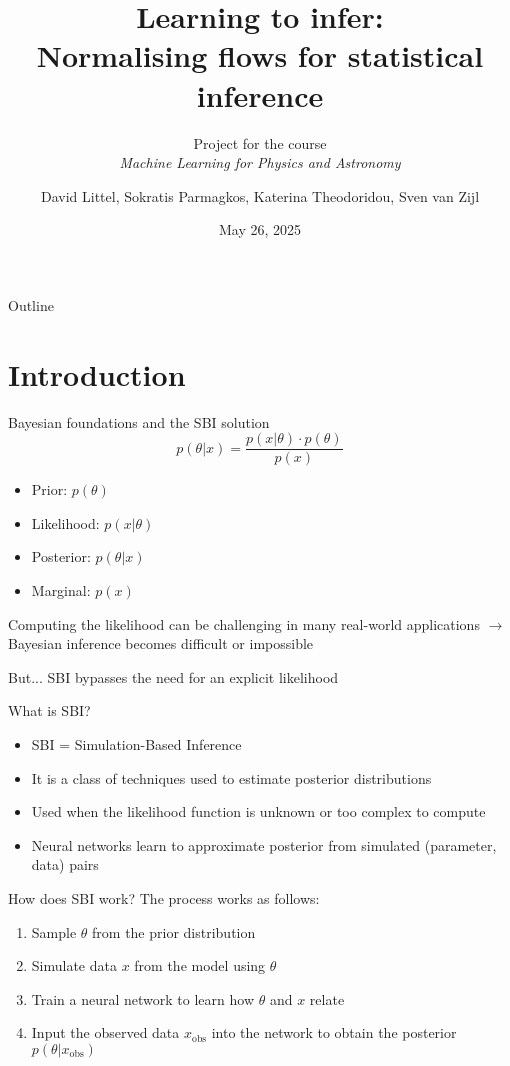 \documentclass{beamer}
\title[Normalising flows]{Learning to infer:\\Normalising flows for statistical inference}
\subtitle{Project for the course\\\textit{Machine Learning for Physics and Astronomy}}
\author[DL, SP, KT, SvZ]{David Littel, Sokratis Parmagkos, Katerina Theodoridou, Sven van Zijl} %
\date{May 26, 2025}
\begin{document}
\begin{frame}
\titlepage
\end{frame}

\begin{frame}{Outline}
\tableofcontents
\end{frame}

\section{Introduction}
\begin{frame}{Bayesian foundations and the SBI solution}
\[
p(\theta | x) = \frac{p(x | \theta) \cdot p(\theta)}{p(x)}
\]
\begin{itemize}
\item Prior: $p(\theta)$
\item Likelihood: $p(x|\theta)$
\item Posterior: $p(\theta|x)$
\item Marginal: $p(x)$
\end{itemize}
Computing the likelihood can be challenging in many real-world applications $\to$ Bayesian inference becomes difficult or impossible

But... SBI bypasses the need for an explicit likelihood
\end{frame}

\begin{frame}{What is SBI?}
\begin{itemize}
\item SBI = Simulation-Based Inference
\item It is a class of techniques used to estimate posterior distributions
\item Used when the likelihood function is unknown or too complex to compute
\item Neural networks learn to approximate posterior from simulated (parameter, data) pairs
\end{itemize}
\end{frame}

\begin{frame}{How does SBI work?}
The process works as follows:
\begin{enumerate}
\item Sample $\theta$ from the prior distribution
\item Simulate data $x$ from the model using $\theta$
\item Train a neural network to learn how $\theta$ and $x$ relate
\item Input the observed data $x_\text{obs}$ into the network to obtain the posterior $p(\theta | x_\text{obs})$
\end{enumerate}
\end{frame}
\end{document}
